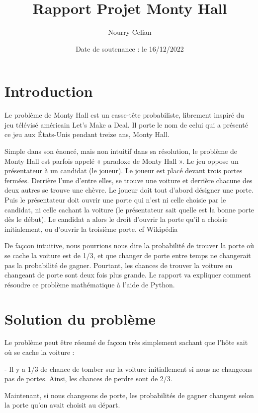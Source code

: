 \documentclass{article}
\title{Rapport Projet Monty Hall}
\author{Nourry Celian}
\date{Date de soutenance : le 16/12/2022}
\begin{document}
\maketitle

\section{Introduction}
Le problème de Monty Hall est un casse-tête probabiliste, librement inspiré du jeu télévisé américain Let's Make a Deal. Il porte le nom de celui qui a présenté ce jeu aux États-Unis pendant treize ans, Monty Hall.
\newline

Simple dans son énoncé, mais non intuitif dans sa résolution, le problème de Monty Hall est parfois appelé « paradoxe de Monty Hall ». 
Le jeu oppose un présentateur à un candidat (le joueur). Le joueur est placé devant trois portes fermées. Derrière l'une d'entre elles, se trouve une voiture et derrière chacune des deux autres se trouve une chèvre. Le joueur doit tout d'abord désigner une porte. Puis le présentateur doit ouvrir une porte qui n'est ni celle choisie par le candidat, ni celle cachant la voiture (le présentateur sait quelle est la bonne porte dès le début). Le candidat a alors le droit d'ouvrir la porte qu'il a choisie initialement, ou d'ouvrir la troisième porte. cf Wikipédia
\newline

De façcon intuitive, nous pourrions nous dire la probabilité de trouver la porte où se cache la voiture est de 1/3, et que changer de porte entre temps ne changerait pas la probabilité de gagner. Pourtant, les chances de trouver la voiture en changeant de porte sont deux fois plus grande. Le rapport va expliquer comment résoudre ce problème mathématique à l'aide de Python.
\section{Solution du problème}
Le problème peut être résumé de façcon très simplement sachant que l'hôte sait où se cache la voiture :
 \newline
 
 - Il y a 1/3 de chance de tomber sur la voiture initiallement si nous ne changeons pas de portes. Ainsi, les chances de perdre sont de 2/3.
\newline

 Maintenant, si nous changeons de porte, les probabilités de gagner changent selon la porte qu'on avait choisit au départ.
\newline
\end{document}
